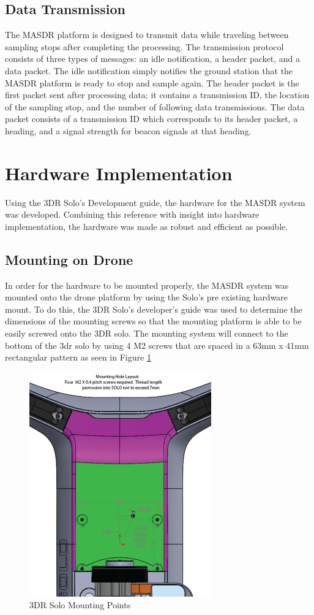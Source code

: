 \subsection{Data Transmission}
The MASDR platform is designed to transmit data while traveling between sampling stops after completing the processing. The transmission protocol consists of three types of messages: an idle notification, a header packet, and a data packet. The idle notification simply notifies the ground station that the MASDR platform is ready to stop and sample again. The header packet is the first packet sent after processing data; it contains a transmission ID, the location of the sampling stop, and the number of following data transmissions. The data packet consists of a transmission ID which corresponds to its header packet, a heading, and a signal strength for beacon signals at that heading.

\section{Hardware Implementation}
Using the 3DR Solo’s Development guide, the hardware for the MASDR system was developed. Combining this reference with insight into hardware implementation, the hardware was made as robust and efficient as possible.
\subsection{Mounting on Drone}
In order for the hardware to be mounted properly, the MASDR system was mounted onto the drone platform by using the Solo’s pre existing hardware mount. To do this, the 3DR Solo’s developer's guide was used to determine the dimensions of the mounting screws so that the mounting platform is able to be easily screwed onto the 3DR solo. The mounting system will connect to the bottom of the 3dr solo by using 4 M2 screws that are spaced in a 63mm x 41mm rectangular pattern as seen in Figure \ref{fig:Solo_mount}
\begin{figure}[ht]
\centering
\includegraphics[width=0.70\textwidth]{img/solo_mount_points.png}
\caption{3DR Solo Mounting Points}
\label{fig:Solo_mount}
\end{figure}
